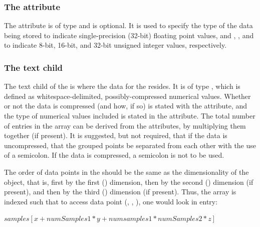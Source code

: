 \subsubsection{The \fixttspace{} attribute}
The  attribute is of type  and is optional.  It is used to specify the type of the data being stored  to indicate single-precision (32-bit) floating point values, and , , and  to indicate 8-bit, 16-bit, and 32-bit unsigned integer values, respectively.

\subsubsection{The \fixttspace{} text child}
The  text child of the \SampledField is where the data for the \SampledField resides.  It is of type , which is defined as whitespace-delimited, possibly-compressed numerical values.  Whether or not the data is compressed (and how, if so) is stated with the  attribute, and the type of numerical values included is stated in the  attribute.  The total number of entries in the array can be derived from the  attributes, by multiplying them together (if present).  It is suggested, but not required, that if the data is uncompressed, that the grouped points be separated from each other with the use of a semicolon.  If the data is compressed, a semicolon is not to be used.

\begin{blockChanged}
The order of data points in the  should be the same as the dimensionality of the object, that is, first by the first () dimension, then by the second () dimension (if present), and then by the third () dimension (if present).  Thus, the array is indexed such that to access data point (, , ), one would look in entry:

$samples[x + numSamples1*y + numsamples1*numSamples2*z]$
\end{blockChanged}

